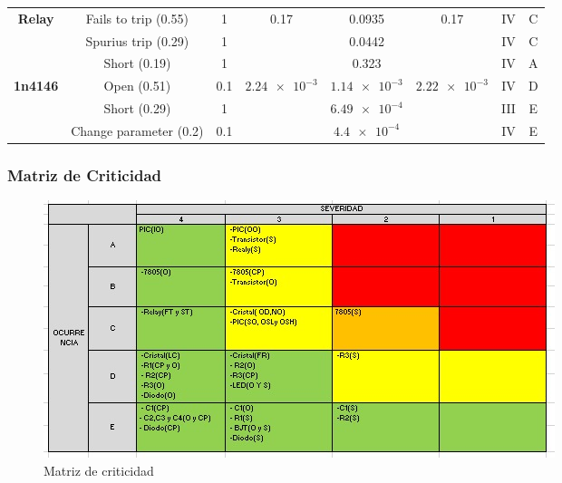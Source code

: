\documentclass{article}
\begin{document}
\begin{table}[H]
{\begin{tabular}{@{}|c|c|c|c|c|c|c|c|@{}}
\multirow{3}{*}{\textbf{Relay}} & Fails to trip (0.55) & 1 & \multirow{3}{*}{0.17} & 0.0935 & \multirow{3}{*}{0.17} & IV & C \\ \cmidrule(lr){2-3} \cmidrule(lr){5-5} \cmidrule(l){7-8} 
 & Spurius trip (0.29) & 1 &  & 0.0442 &  & IV & C \\ \cmidrule(lr){2-3} \cmidrule(lr){5-5} \cmidrule(l){7-8} 
 & Short (0.19) & 1 &  & 0.323 &  & IV & A \\ \midrule
\multirow{3}{*}{\textbf{1n4146}} & Open (0.51) & 0.1 & \multirow{3}{*}{$\num{2.24e-3}$} & $\num{1.14e-3}$ & \multirow{3}{*}{$\num{2.22e-3}$} & IV & D \\ \cmidrule(lr){2-3} \cmidrule(lr){5-5} \cmidrule(l){7-8} 
 & Short (0.29) & 1 &  & $\num{6.49e-4}$ &  & III & E \\ \cmidrule(lr){2-3} \cmidrule(lr){5-5} \cmidrule(l){7-8} 
 & Change parameter (0.2) & 0.1 &  & $\num{4.4e-4}$ &  & IV & E \\ \bottomrule
\end{tabular}%
}
\end{table}

\clearpage

\subsubsection {Matriz de Criticidad}

\begin{figure}[h]
 \centering
	\includegraphics[width=\textwidth]{imagenes/matriz.jpeg} 
	\caption{Matriz de criticidad}
\end{figure}
\end{document}
